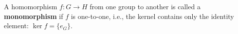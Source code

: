 A homomorphism $f \colon G \to H$ from one group to another is called a \textbf{monomorphism} if $f$ is one-to-one, i.e., the kernel contains only the identity element: $\ker f = \{e_G\}$.
